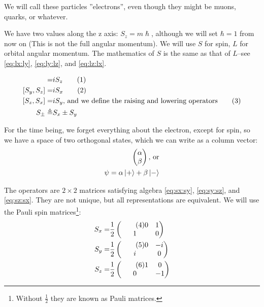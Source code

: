 \documentclass[]{article}
\newcommand\numberthis{\addtocounter{equation}{1}\tag{\theequation}}
\begin{document}
We will call these particles ''electrons'', even though they might be muons, quarks, or whatever.

We have two values along the z axis: $S_z = m \hslash$, although we will set $\hbar=1$ from now on (This is not the full angular momentum). We will use $S$ for spin, $L$ for orbital angular momentum. The mathematics of $S$ is the same as that of $L$--see \eqref{eq:lx:ly},  \eqref{eq:ly:lz}, and  \eqref{eq:lz:lx}.

\begin{align*}
	[S_x,S_y] =& i S_z \numberthis \label{eq:sx:sy}\\
	[S_y,S_z] =& i S_x  \numberthis \label{eq:sy:sz}\\
	[S_z,S_x] =& i S_y \text{, and we define the raising and lowering operators} \numberthis \label{eq:sz:sx}\\
	S_\pm \triangleq& S_x \pm S_y 
\end{align*}

For the time being, we forget everything about the electron, except for spin, so we have a space of two orthogonal states, which we can write as a column vector:
\begin{align*}
	\begin{pmatrix}
		\alpha\\
		\beta
	\end{pmatrix} \text{, or}\\
	\psi = \alpha\ket{+} + \beta\ket{-}
\end{align*}


The operators are $2\times 2$ matrices satisfying algebra \eqref{eq:sx:sy}, \eqref{eq:sy:sz}, and \eqref{eq:sz:sx}. They are not unique, but all representations are equivalent. We will use the Pauli spin matrices\footnote{Without $\frac{1}{2}$ they are known as Pauli matrices.}:
\begin{align*}
	S_x =& \frac{1}{2}\begin{pmatrix} \numberthis \label{eq:pauli:x}
		0&1\\
		1&0
	\end{pmatrix}\\
	S_y =& \frac{1}{2}\begin{pmatrix} \numberthis \label{eq:pauli:y}
		0&-i\\
		i&0
	\end{pmatrix}\\
	S_z =& \frac{1}{2}\begin{pmatrix} \numberthis \label{eq:pauli:z}
		1&0\\
		0&-1
	\end{pmatrix}
\end{align*}
\end{document}
